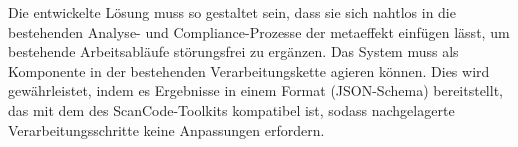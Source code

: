 \begin{anforderungsliste}
        {Die entwickelte Lösung muss so gestaltet sein, dass sie sich nahtlos in die bestehenden Analyse- und Compliance-Prozesse der metaeffekt einfügen lässt, um bestehende Arbeitsabläufe störungsfrei zu ergänzen.}
        {Das System muss als Komponente in der bestehenden Verarbeitungskette agieren können. Dies wird gewährleistet, indem es Ergebnisse in einem Format (JSON-Schema) bereitstellt, das mit dem des ScanCode-Toolkits kompatibel ist, sodass nachgelagerte Verarbeitungsschritte keine Anpassungen erfordern.}
\end{anforderungsliste}
